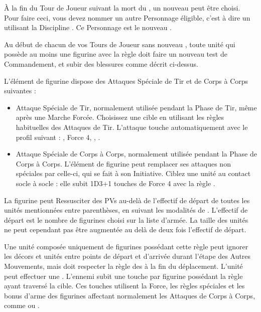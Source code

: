 À la fin du Tour de Joueur suivant la mort du \master{}, un nouveau \master{} peut être choisi. Pour faire ceci, vous devez nommer un autre Personnage éligible, c'est à dire un \wizard{} utilisant la Discipline \necromancy{}. Ce Personnage est le nouveau \master{}.

Au début de chacun de vos Tours de Joueur sans nouveau \master{}, toute unité qui possède au moins une figurine avec la règle \ashestoashes{} doit faire un nouveau test de Commandement, et subir des blessures comme décrit ci-dessus.

\armyspecialruleentry{\wailofwoe}

L'élément de figurine dispose des Attaques Spéciale de Tir et de Corps à Corps suivantes :
\begin{itemize}[label={-}]
\item Attaque Spéciale de Tir, normalement utilisée pendant la Phase de Tir, même après une Marche Forcée. Choisissez une cible en utilisant les règles habituelles des Attaques de Tir. L'attaque touche automatiquement avec le profil suivant :\newline
{}, Force 4, \magicalattacks{}, .
\item Attaque Spéciale de Corps à Corps, normalement utilisée pendant la Phase de Corps à Corps. L'élément de figurine peut remplacer ses attaques non spéciales par celle-ci, qui se fait à son Initiative. Ciblez une unité au contact socle à socle : elle subit 1D3+1 touches de Force 4 avec la règle \magicalattacks{}.
\end{itemize}



La figurine peut Ressusciter des PVs au-delà de l'effectif de départ de toutes les unités mentionnées entre parenthèses, en suivant les modalités de \raisewounds{}. L'effectif de départ est le nombre de figurines choisi sur la liste d'armée. La taille des unités ne peut cependant pas être augmentée au delà de deux fois l'effectif de départ.

\newpage
\armyspecialruleentry{\reaper}

Une unité composée uniquement de figurines possédant cette règle peut ignorer les décors et unités entre points de départ et d'arrivée durant l'étape des Autres Mouvements, mais doit respecter la règle des  à la fin du déplacement. L'unité peut effectuer une \sweepingattack{}. L'ennemi subit une touche par figurine possédant la règle \reaper{} ayant traversé la cible. Ces touches utilisent la Force, les règles spéciales et les bonus d'arme des figurines affectant normalement les Attaques de Corps à Corps, comme \flamingattacks{} ou \armourpiercing{}.

